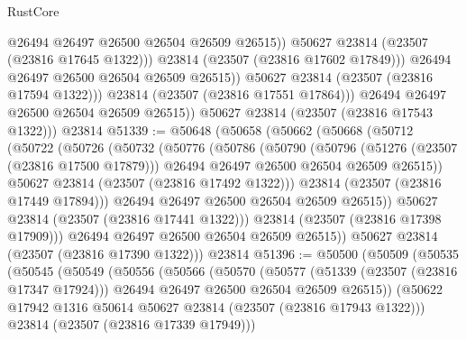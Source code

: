 \begin{lexlean}{RustCore}
\begin{coremodule}
                          @26494
                          @26497
                          @26500
                          @26504
                          @26509
                          @26515))
                      @50627
                      @23814
                      (@23507 (@23816 @17645 @1322)))
                    @23814
                    (@23507 (@23816 @17602 @17849)))
                  @26494
                  @26497
                  @26500
                  @26504
                  @26509
                  @26515))
              @50627
              @23814
              (@23507 (@23816 @17594 @1322)))
            @23814
            (@23507 (@23816 @17551 @17864)))
          @26494
          @26497
          @26500
          @26504
          @26509
          @26515))
      @50627
      @23814
      (@23507 (@23816 @17543 @1322)))
    @23814
@51339 := @50648
    (@50658
      (@50662
        (@50668
          (@50712
            (@50722
              (@50726
                (@50732
                  (@50776
                    (@50786
                      (@50790
                        (@50796
                          (@51276 (@23507 (@23816 @17500 @17879)))
                          @26494
                          @26497
                          @26500
                          @26504
                          @26509
                          @26515))
                      @50627
                      @23814
                      (@23507 (@23816 @17492 @1322)))
                    @23814
                    (@23507 (@23816 @17449 @17894)))
                  @26494
                  @26497
                  @26500
                  @26504
                  @26509
                  @26515))
              @50627
              @23814
              (@23507 (@23816 @17441 @1322)))
            @23814
            (@23507 (@23816 @17398 @17909)))
          @26494
          @26497
          @26500
          @26504
          @26509
          @26515))
      @50627
      @23814
      (@23507 (@23816 @17390 @1322)))
    @23814
@51396 := @50500
    (@50509
      (@50535
        (@50545
          (@50549
            (@50556
              (@50566
                (@50570
                  (@50577
                    (@51339 (@23507 (@23816 @17347 @17924)))
                    @26494
                    @26497
                    @26500
                    @26504
                    @26509
                    @26515))
                (@50622 @17942 @1316 @50614 @50627 @23814 (@23507 (@23816 @17943 @1322)))
                @23814
                (@23507 (@23816 @17339 @17949)))

\end{coremodule}
\end{lexlean}
